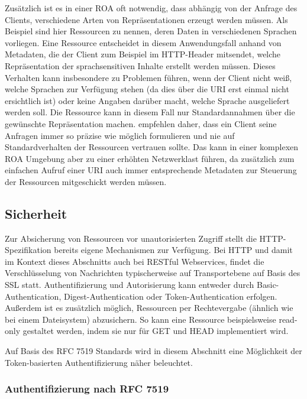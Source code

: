 Zusätzlich ist es in einer \ac{ROA} oft notwendig, dass abhängig von der Anfrage des Clients, verschiedene Arten von Repräsentationen erzeugt werden müssen. Als Beispiel sind hier Ressourcen zu nennen, deren Daten in verschiedenen Sprachen vorliegen. Eine Ressource entscheidet in diesem Anwendungsfall anhand von Metadaten, die der Client zum Beispiel im HTTP-Header mitsendet, welche Repräsentation der sprachsensitiven Inhalte erstellt werden müssen. Dieses Verhalten kann insbesondere zu Problemen führen, wenn der Client nicht weiß, welche Sprachen zur Verfügung stehen (da dies über die \ac{URI} erst einmal nicht ersichtlich ist) oder keine Angaben darüber macht, welche Sprache ausgeliefert werden soll. Die Ressource kann in diesem Fall nur Standardannahmen über die gewünschte Repräsentation machen. \citeauthor{Ruby2007} empfehlen daher, dass ein Client seine Anfragen immer so präzise wie möglich formulieren und nie auf Standardverhalten der Ressourcen vertrauen sollte. Das kann in einer komplexen \ac{ROA} Umgebung aber zu einer erhöhten Netzwerklast führen, da zusätzlich zum einfachen Aufruf einer \ac{URI} auch immer entsprechende Metadaten zur Steuerung der Ressourcen mitgeschickt werden müssen. \parencite[vgl.][94]{Ruby2007}

\subsection{Sicherheit}
\label{sec:ROA:Sicherheit}

Zur Absicherung von Ressourcen vor unautorisierten Zugriff stellt die HTTP-Spezifikation bereits eigene Mechanismen zur Verfügung. Bei HTTP und damit im Kontext dieses Abschnitts auch bei RESTful Webservices, findet die Verschlüsselung von Nachrichten typischerweise auf Transportebene auf Basis des \ac{SSL} statt. Authentifizierung und Autorisierung kann entweder durch Basic-Authentication, Digest-Authentication oder Token-Authentication erfolgen. Außerdem ist es zusätzlich möglich, Ressourcen per Rechtevergabe (ähnlich wie bei einem Dateisystem) abzusichern. So kann eine Ressource beispielsweise read-only gestaltet werden, indem sie nur für GET und HEAD implementiert wird. \parencite[vgl.][311\psq]{Ruby2007}

Auf Basis des \ac{RFC} 7519 Standards wird in diesem Abschnitt eine Möglichkeit der Token-basierten Authentifizierung näher beleuchtet.

\subsubsection{Authentifizierung nach \ac{RFC} 7519}

